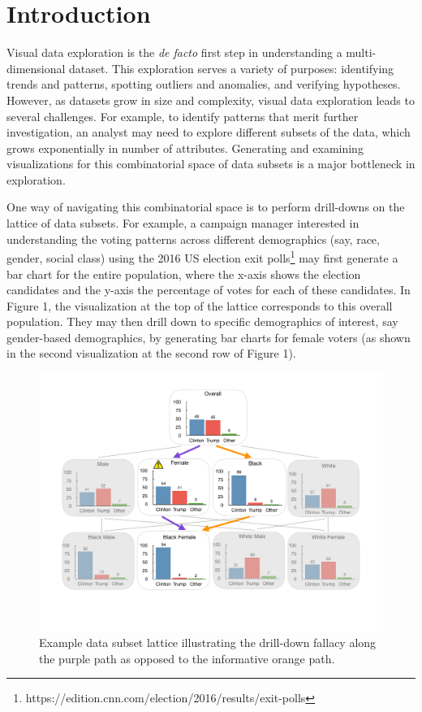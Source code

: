\section{Introduction}

Visual data exploration is the \emph{de facto} first step in understanding a multi-dimensional dataset. This exploration serves a variety of purposes: identifying trends and patterns, spotting outliers and anomalies, and verifying hypotheses. However, as datasets grow in size and complexity, visual data exploration leads to several challenges. For example, to identify patterns that merit further investigation, an analyst may need to explore different subsets of the data, which grows exponentially in number of attributes. Generating and examining visualizations for this combinatorial space of data subsets is a major bottleneck in exploration.

One way of navigating this combinatorial space is to perform drill-downs on the lattice of data subsets. For example, a campaign manager interested in understanding the voting patterns across different demographics (say, race, gender, social class) using the 2016 US election exit polls\footnote{https://edition.cnn.com/election/2016/results/exit-polls} may first generate a bar chart for the entire population, where the x-axis shows the election candidates and the y-axis the percentage of votes for each of these candidates. In Figure 1, the visualization at the top of the lattice corresponds to this overall population. They may then drill down to specific demographics of interest, say gender-based demographics, by generating bar charts for female voters (as shown in the second visualization at the second row of Figure 1).

\begin{figure}[h!]
\includegraphics[width=\linewidth]{figures/elections_example_lattice_teaser.pdf}
\caption{Example data subset lattice illustrating the drill-down fallacy along the purple path as opposed to the informative orange path.}
\label{fig:elections_example}
\end{figure}

